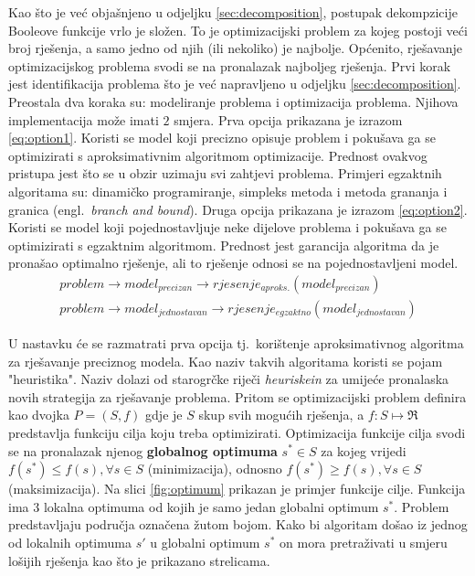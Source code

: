 \documentclass[times, utf8, diplomski]{fer}
\begin{document}
Kao što je već objašnjeno u odjeljku \ref{sec:decomposition}, postupak dekompzicije Booleove funkcije vrlo je složen. To je optimizacijski problem za kojeg postoji veći broj rješenja, a samo jedno od njih (ili nekoliko) je najbolje. Općenito, rješavanje optimizacijskog problema svodi se na pronalazak najboljeg rješenja. Prvi korak jest identifikacija problema što je već napravljeno u odjeljku \ref{sec:decomposition}. Preostala dva koraka su: modeliranje problema i optimizacija problema. Njihova implementacija može imati $2$ smjera. Prva opcija prikazana je izrazom \ref{eq:option1}. Koristi se model koji precizno opisuje problem i pokušava ga se optimizirati s aproksimativnim algoritmom optimizacije. Prednost ovakvog pristupa jest što se u obzir uzimaju svi zahtjevi problema. Primjeri egzaktnih algoritama su: dinamičko programiranje, simpleks metoda i metoda grananja i granica (engl.~\textit{branch and bound}). Druga opcija prikazana je izrazom \ref{eq:option2}. Koristi se model koji pojednostavljuje neke dijelove problema i pokušava ga se optimizirati s egzaktnim algoritmom. Prednost jest garancija algoritma da je pronašao optimalno rješenje, ali to rješenje odnosi se na pojednostavljeni model.
%
\begin{gather}
	\label{eq:option1}
	problem \rightarrow model_{precizan} \rightarrow rjesenje_{aproks.}(model_{precizan}) \\
	\label{eq:option2}
	problem \rightarrow model_{jednostavan} \rightarrow rjesenje_{egzaktno}(model_{jednostavan})
\end{gather}

U nastavku će se razmatrati prva opcija tj.~korištenje aproksimativnog algoritma za rješavanje preciznog modela. Kao naziv takvih algoritama koristi se pojam "heuristika". Naziv dolazi od starogrčke riječi \textit{heuriskein} za umijeće pronalaska novih strategija za rješavanje problema. Pritom se optimizacijski problem definira kao dvojka $P=(S,f)$ gdje je $S$ skup svih mogućih rješenja, a $f:S \mapsto \Re$ predstavlja funkciju cilja koju treba optimizirati. Optimizacija funkcije cilja svodi se na pronalazak njenog \textbf{globalnog optimuma} $s^{*} \in S$ za kojeg vrijedi $f(s^{*}) \leq f(s), \forall s \in S$ (minimizacija), odnosno $f(s^{*}) \geq f(s), \forall s \in S$ (maksimizacija). Na slici \ref{fig:optimum} prikazan je primjer funkcije cilje. Funkcija ima $3$ lokalna optimuma od kojih je samo jedan globalni optimum $s^{*}$. Problem predstavljaju područja označena žutom bojom. Kako bi algoritam došao iz jednog od lokalnih optimuma $s'$ u globalni optimum $s^{*}$ on mora pretraživati u smjeru lošijih rješenja kao što je prikazano strelicama.
\end{document}
